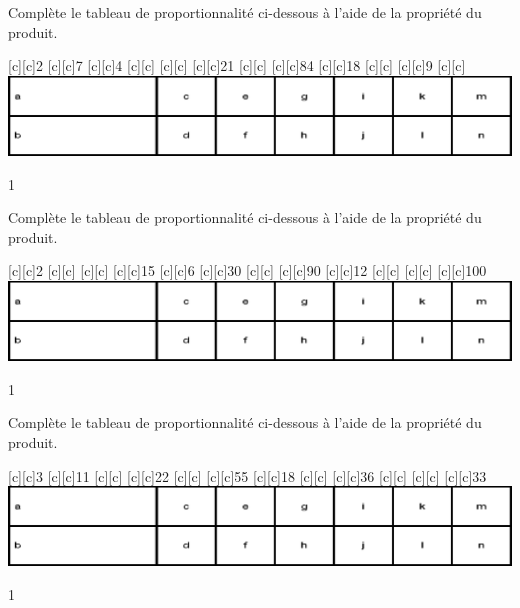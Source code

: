 \documentclass[a4paper,11pt]{report}
\begin{document}
\begin{exop}{
Complète le tableau de proportionnalité ci-dessous à l'aide de la propriété du produit.
\begin{center}
[c][c]{2}
[c][c]{7}
[c][c]{4}
[c][c]{}
[c][c]{}
[c][c]{21}
[c][c]{}
[c][c]{84}
[c][c]{18}
[c][c]{}
[c][c]{9}
[c][c]{}
\includegraphics[scale=.9]{media/fa-30/tableaut.eps}
\end{center}
\vspace{-0.5cm}}{1}
\end{exop}
\begin{exop}{
Complète le tableau de proportionnalité ci-dessous à l'aide de la propriété du produit.
\begin{center}
[c][c]{2}
[c][c]{}
[c][c]{}
[c][c]{15}
[c][c]{6}
[c][c]{30}
[c][c]{}
[c][c]{90}
[c][c]{12}
[c][c]{}
[c][c]{}
[c][c]{100}
\includegraphics[scale=.9]{media/fa-30/tableaut.eps}
\end{center}
\vspace{-0.5cm}}{1}
\end{exop}
\begin{exop}{
Complète le tableau de proportionnalité ci-dessous à l'aide de la propriété du produit.
\begin{center}
[c][c]{3}
[c][c]{11}
[c][c]{}
[c][c]{22}
[c][c]{}
[c][c]{55}
[c][c]{18}
[c][c]{}
[c][c]{36}
[c][c]{}
[c][c]{}
[c][c]{33}
\includegraphics[scale=.9]{media/fa-30/tableaut.eps}
\end{center}
\vspace{-0.5cm}}{1}
\end{exop}
\end{document}
